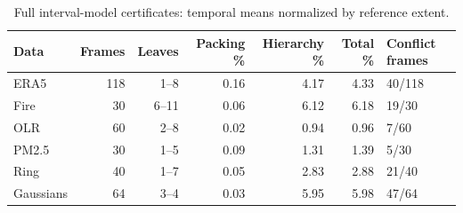 \begin{table}[t]
\caption{Full interval-model certificates: temporal means normalized by reference extent.}\label{tab:cert}
\centering\footnotesize
\setlength{\tabcolsep}{3pt}
\begin{tabular}{lrrrrrl}\toprule
Data & Frames & Leaves & Packing \% & Hierarchy \% & Total \% & Conflict frames\\\midrule
ERA5 & 118 & 1--8 & 0.16 & 4.17 & 4.33 & 40/118\\
Fire & 30 & 6--11 & 0.06 & 6.12 & 6.18 & 19/30\\
OLR & 60 & 2--8 & 0.02 & 0.94 & 0.96 & 7/60\\
PM2.5 & 30 & 1--5 & 0.09 & 1.31 & 1.39 & 5/30\\
Ring & 40 & 1--7 & 0.05 & 2.83 & 2.88 & 21/40\\
Gaussians & 64 & 3--4 & 0.03 & 5.95 & 5.98 & 47/64\\
\bottomrule\end{tabular}
\par{}
\end{table}
